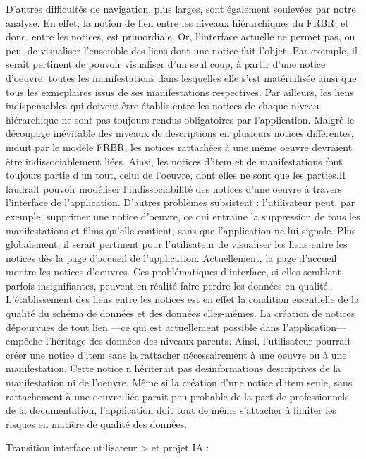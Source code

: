 D'autres difficultés de navigation, plus larges, sont également soulevées par notre analyse. En effet, la notion de lien entre les niveaux hiérarchiques du FRBR, et donc, entre les notices, est primordiale. Or, l'interface actuelle ne permet pas, ou peu, de visualiser l'ensemble des liens dont une notice fait l'objet. Par exemple, il serait pertinent de pouvoir visualiser d'un seul coup, à partir d'une notice d'oeuvre, toutes les manifestations dans lesquelles elle s'est matérialisée ainsi que tous les exmeplaires issus de ses manifestations respectives. Par ailleurs, les liens indispensables qui doivent être établis entre les notices de chaque niveau hiérarchique ne sont pas toujours rendus obligatoires par l'application. Malgré le découpage inévitable des niveaux de descriptions en plusieurs notices différentes, induit par le modèle FRBR, les notices rattachées à une même oeuvre devraient être indissociablement liées. Ainsi, les notices d'item et de manifestations font toujours partie d'un tout, celui de l'oeuvre, dont elles ne sont que les parties.Il faudrait pouvoir modéliser l'indissociabilité des notices d'une oeuvre à travers l'interface de l'application. D'autres problèmes subsistent : l'utilisateur peut, par exemple, supprimer une notice d'oeuvre, ce qui entraine la suppression de tous les manifestations et films qu'elle contient, sans que l'application ne lui signale. Plus globalement, il serait pertinent pour l'utilisateur de visualiser les liens entre les notices dès la page d'accueil de l'application. Actuellement, la page d'accueil montre les notices d'oeuvres. 
Ces problématiques d'interface, si elles semblent parfois insignifiantes, peuvent en réalité faire perdre les données en qualité. L'établissement des liens entre les notices est en effet la condition essentielle de la qualité du schéma de données et des données elles-mêmes. La création de notices dépourvues de tout lien ---ce qui est actuellement possible dans l'application--- empêche l'héritage des données des niveaux parents. Ainsi, l'utilisateur pourrait créer une notice d'item sans la rattacher nécessairement à une oeuvre ou à une manifestation. Cette notice n'hériterait pas desinformations descriptives de la manifestation ni de l'oeuvre. Même si la création d'une notice d'item seule, sans rattachement à une oeuvre liée parait peu probable de la part de professionnels de la documentation, l'application doit tout de même s'attacher à limiter les risques en matière de qualité des données. 

Transition interface utilisateur > et projet IA :

